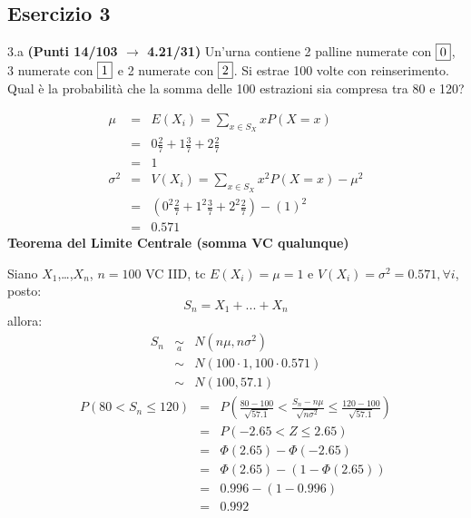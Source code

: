 \documentclass[
  11pt,
]{book}
\theoremstyle{mytheoremstyle}
\theoremstyle{mydefstyle}
\newenvironment{sol}
  {
  \begin{tcolorbox}[enhanced,breakable,arc=0.1mm,boxrule=1pt,colback=white,colframe=iblue,
  title=\bf \fontfamily{lmss}\selectfont \hspace{.5 cm} Soluzione,drop fuzzy shadow]

}{
\end{tcolorbox}
  }
\begin{document}
\subsection{Esercizio 3}\label{esercizio-3-23}

3.a \textbf{(Punti 14/103 \(\rightarrow\) 4.21/31)} Un'urna contiene 2 palline numerate con \(\fbox{0}\), 3 numerate con \(\fbox{1}\) e 2 numerate con \(\fbox{2}\). Si estrae 100 volte con reinserimento. Qual è la probabilità che la somma delle 100 estrazioni sia compresa tra 80 e 120?

\begin{sol}
\begin{eqnarray*} \mu &=& E(X_i) = \sum_{x\in S_X}x P(X=x)\\ 
 &=&  0  \frac { 2 }{ 7 }+ 1  \frac { 3 }{ 7 }+ 2  \frac { 2 }{ 7 } \\ 
            &=& 1 \\ 
 \sigma^2 &=& V(X_i) = \sum_{x\in S_X}x^2 P(X=x)-\mu^2\\ 
 &=&\left(  0  ^2\frac { 2 }{ 7 }+ 1  ^2\frac { 3 }{ 7 }+ 2  ^2\frac { 2 }{ 7 } \right)-( 1 )^2\\ 
            &=& 0.571 
\end{eqnarray*}
\textbf{Teorema del Limite Centrale (somma VC qualunque)}

Siano \(X_1\),\ldots,\(X_n\), \(n=100\) VC IID, tc \(E(X_i)=\mu=1\) e \(V(X_i)=\sigma^2=0.571,\forall i\), posto:
\[
      S_n = X_1 + ... + X_n
      \]
allora:\begin{eqnarray*}
  S_n & \mathop{\sim}\limits_{a}& N(n\mu,n\sigma^2) \\
     &\sim & N(100\cdot1,100\cdot0.571) \\
     &\sim & N(100,57.1) 
  \end{eqnarray*}\begin{eqnarray*}
   P( 80 < S_n \leq  120 ) &=& P\left( \frac { 80  -  100 }{\sqrt{ 57.1 }} < \frac { S_n  -  n\mu }{ \sqrt{n\sigma^2} } \leq \frac { 120  -  100 }{\sqrt{ 57.1 }}\right)  \\
              &=& P\left(  -2.65  < Z \leq  2.65 \right) \\
              &=& \Phi( 2.65 )-\Phi( -2.65 )\\
              &=&  \Phi( 2.65 )-(1-\Phi( 2.65 )) \\ &=&  0.996 -(1- 0.996 ) \\ 
              &=&  0.992 
   \end{eqnarray*}

\end{sol}
\end{document}
